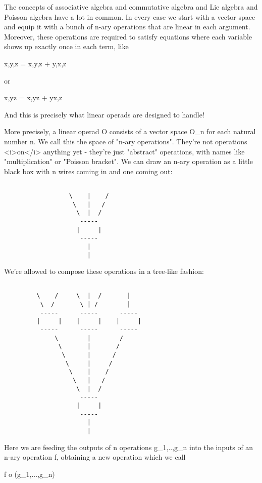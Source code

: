 The concepts of associative algebra and commutative algebra and Lie
algebra and Poisson algebra have a lot in common.  In every case we
start with a vector space and equip it with a bunch of n-ary
operations that are linear in each argument.  Moreover, these
operations are required to satisfy equations where each variable shows
up exactly once in each term, like

{x,{y,z}} = {{x,y},z} + {y,{x,z}}

or 

{x,yz} = {x,y}z + y{x,z}

And this is precisely what linear operads are designed to handle!

More precisely, a linear operad O consists of a vector space O_{n} for
each natural number n.  We call this the space of "n-ary operations".
They're not operations <i>on</i> anything yet - they're just
"abstract" operations, with names like
"multiplication" or "Poisson bracket".  We can
draw an n-ary operation as a little black box with n wires coming in
and one coming out:


\begin{verbatim}

                  \    |    /
                   \   |   / 
                    \  |  /
                     -----
                    |     | 
                     -----
                       |
                       |
\end{verbatim}
    
We're allowed to compose these operations in a tree-like fashion:


\begin{verbatim}

         \    /     \  |  /       | 
          \  /       \ | /        |
          -----      -----      -----
         |     |    |     |    |     |
          -----      -----      -----
              \        |        /  
               \       |       /
                \      |      /
                 \     |     /
                  \    |    / 
                   \   |   /  
                    \  |  /
                     -----
                    |     | 
                     -----
                       |
                       |
\end{verbatim}
    

Here we are feeding the outputs of n operations
g_{1},..,g_{n} into the inputs of an n-ary operation
f, obtaining a new operation which we call

f o (g_{1},...,g_{n})

